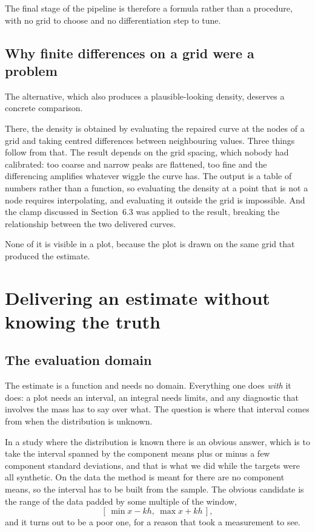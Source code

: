\documentclass[11pt]{article}
\begin{document}
The final stage of the pipeline is therefore a formula rather than a procedure, with no grid
to choose and no differentiation step to tune.

\subsection{Why finite differences on a grid were a problem}

The alternative, which also produces a plausible-looking density, deserves a concrete
comparison.

There, the density is obtained by evaluating the repaired curve at the nodes of a grid and
taking centred differences between neighbouring values. Three things follow from that. The
result depends on the grid spacing, which nobody had calibrated: too coarse and narrow peaks
are flattened, too fine and the differencing amplifies whatever wiggle the curve has. The
output is a table of numbers rather than a function, so evaluating the density at a point
that is not a node requires interpolating, and evaluating it outside the grid is impossible.
And the clamp discussed in Section~6.3 was applied to the result, breaking the relationship
between the two delivered curves.

None of it is visible in a plot, because the plot is drawn on the same grid that produced the
estimate.

\section{Delivering an estimate without knowing the truth}
\label{sec:delivery}

\subsection{The evaluation domain}

The estimate is a function and needs no domain. Everything one does \emph{with} it does: a
plot needs an interval, an integral needs limits, and any diagnostic that involves the mass
has to say over what. The question is where that interval comes from when the distribution is
unknown.

In a study where the distribution is known there is an obvious answer, which is to take the
interval spanned by the component means plus or minus a few component standard deviations,
and that is what we did while the targets were all synthetic. On the data the method is meant
for there are no component means, so the interval has to be built from the sample. The obvious candidate is the range of the data padded by
some multiple of the window,
\[
[\,\min x - k h,\ \max x + k h\,],
\]
and it turns out to be a poor one, for a reason that took a measurement to see.
\end{document}

